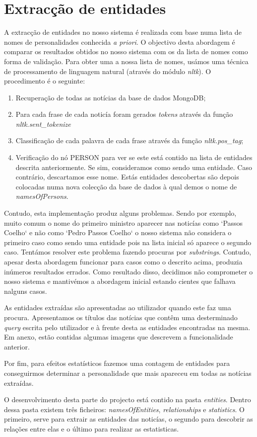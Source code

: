 \section{Extracção de entidades}
A extracção de entidades no nosso sistema é realizada com base numa lista de nomes de personalidades conhecida \textit{a priori}. O objectivo desta abordagem é comparar os resultados obtidos no nosso sistema com os da lista de nomes como forma de validação. Para obter uma a nossa lista de nomes, usámos uma técnica de processamento de linguagem natural (através do módulo \textit{nltk}). O procedimento é o seguinte:


\begin{enumerate}
  \item Recuperação de todas as notícias da base de dados MongoDB;
  \item Para cada frase de cada noticía foram gerados \textit{tokens} através da função \textit{nltk.sent\_tokenize}
  \item Classificação de cada palavra de cada frase através da função \textit{nltk.pos\_tag};
  \item Verificação do nó PERSON para ver se este está contido na lista de entidades descrita anteriormente. Se sim, consideramos como sendo uma entidade. Caso contrário, descartamos esse nome. Estás entidades descobertas são depois colocadas numa nova colecção da base de dados à qual demos o nome de \textit{namesOfPersons}. 
\end{enumerate}

Contudo, esta implementação produz alguns problemas. Sendo por exemplo, muito comum o nome do primeiro ministro aparecer nas noticías como `Passos Coelho` e não como `Pedro Passos Coelho` o nosso sistema não considera o primeiro caso como sendo uma entidade pois na lista inicial só aparece o segundo caso. Tentámos resolver este problema fazendo procuras por \textit{substrings}. Contudo, apesar desta abordagem funcionar para casos como o descrito acima, produzia inúmeros resultados errados. Como resultado disso, decidimos não comprometer o nosso sistema e mantivémos a abordagem inicial estando cientes que falhava nalguns casos.

As entidades extraídas são apresentadas ao utilizador quando este faz uma procura. Apresentamos os títulos das notícias que contêm uma desterminado \textit{query} escrita pelo utilizador e à frente desta as entidades encontradas na mesma. Em anexo, estão contidas algumas imagens que descrevem a funcionalidade anterior.

Por fim, para efeitos estatísticos fazemos uma contagem de entidades para conseguirmos determinar a personalidade que mais apareceu em todas as notícias extraídas.

O desenvolvimento desta parte do projecto está contido na pasta \textit{entities}. Dentro dessa pasta existem três ficheiros: \textit{namesOfEntities}, \textit{relationships} e \textit{statistics}. O primeiro, serve para extrair as entidades das noticías, o segundo para descobrir as relações entre elas e o último para realizar as estatisticas.



